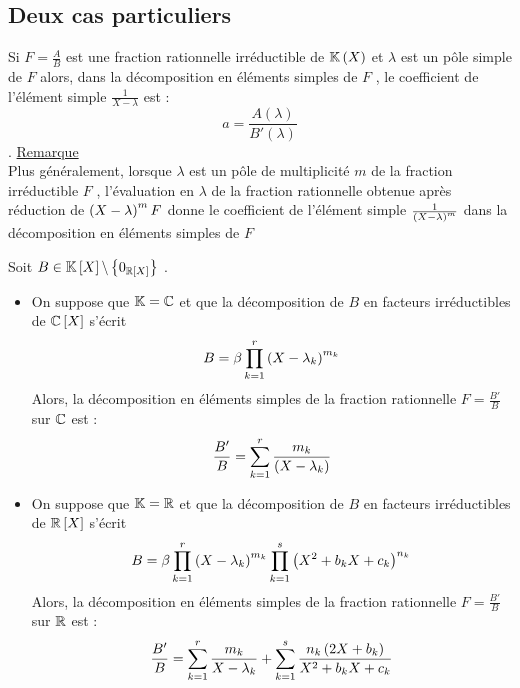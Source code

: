 \subsection{Deux cas particuliers}
\begin{defprop}   
    Si \(F = \frac{A}{B}\) est une fraction rationnelle irréductible de \(\mathbb{K}\left(X\right)\) et \(\lambda\) est un pôle simple de \(F\) alors, dans la décomposition en éléments simples de \(F\) , le coefficient de l’élément simple \(\frac{1}{X - \lambda}\)  est :
    \[a = \frac{A(\lambda )}{B'(\lambda )}\].
    \underline{Remarque} \\
    Plus généralement, lorsque \(\lambda\)  est un pôle de multiplicité \(m\) de la fraction irréductible \(F\) , l’évaluation en \(\lambda\)  de la fraction rationnelle obtenue après réduction de \(\left(X - \lambda \right)^mF\) donne le coefficient de l’élément simple \(\frac{1}{\left(X - \lambda \right)^m}\) dans la décomposition en éléments simples de \(F\) 
\end{defprop}

\begin{defprop}    
    Soit \(B \in \mathbb{K} \left[X\right]  \backslash \left\lbrace0_{\mathbb{R}\left[X\right]}\right\rbrace\) .
    \begin{itemize}
        \item On suppose que \(\mathbb{K} = \mathbb{C}\) et que la décomposition de \(B\) en facteurs irréductibles de \(\mathbb{C} \left[X\right]\) s’écrit
            \[B = \beta \prod^r_{k=1}\left(X - \lambda_k\right)^{m_k}\] 
            Alors, la décomposition en éléments simples de la fraction rationnelle \(F = \frac{B'}{B}\) sur \(\mathbb{C}\) est :
            \[\frac{B'}{B} = \sum^r_{k=1} \frac{m_k}{\left(X - \lambda_k\right)}\]
        \item On suppose que \(\mathbb{K} = \mathbb{R}\) et que la décomposition de \(B\) en facteurs irréductibles de \(\mathbb{R} \left[X\right]\) s’écrit
            \[B = \beta \prod^r_{k=1} \left(X - \lambda_k\right)^{m_k} \prod^s_{k=1}\left(X^2 + b_kX + c_k\right)^{n_k} \]
            Alors, la décomposition en éléments simples de la fraction rationnelle \(F = \frac{B'}{B}\) sur \(\mathbb{R}\) est :
            \[\frac{B'}{B} = \sum^r_{k=1}\frac{m_k}{X - \lambda_k} + \sum^s_{k=1} \frac{n_k \left(2X + b_k\right)}{X^2 + b_kX + c_k}\]
    \end{itemize}
\end{defprop}